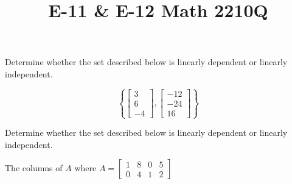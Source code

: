 \documentclass{ximera}
\begin{document}
  	\title{E-11 \& E-12  \hfill Math 2210Q} 

  	
  
 

  	 	\begin{question} Determine whether the set described below is linearly dependent or linearly independent.
  	 		
  $$\left\{ \begin{bmatrix}3\\ 6\\-4\end{bmatrix},\begin{bmatrix}-12\\ -24\\16\end{bmatrix}   \right\}$$

  
  \begin{multipleChoice}
  	\end{multipleChoice}
  	
  		\end{question}
  		
  		
  		\begin{question} Determine whether the set described below is linearly dependent or linearly independent.
  			
  		\begin{center} The columns of $A$ where $A = \begin{bmatrix} 1&8&0&5\\ 0&4&1&2\end{bmatrix}$\end{center}
  			
  			
  			\begin{multipleChoice}
  			\end{multipleChoice}
  			
  		\end{question}
  			
\end{document}
